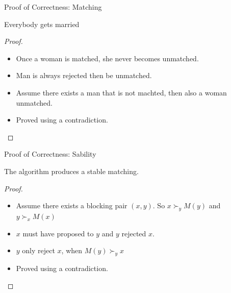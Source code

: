 \documentclass{beamer}
\begin{document}

\begin{frame}{Proof of Correctness: Matching}
\begin{theorem}
    Everybody gets married
\end{theorem} 
\begin{proof}
	\begin{itemize}
		\item Once a woman is matched, she never becomes unmatched.
		\item Man is always rejected then be unmatched.
		\item Assume there exists a man that is not machted, then also a woman unmatched.
		\item Proved using a contradiction.
	\end{itemize}
\end{proof}
\end{frame}






\begin{frame}{Proof of Correctness: Sability}
	\begin{theorem}
		The algorithm produces a stable matching.
	\end{theorem} 
	\begin{proof}
		\begin{itemize}
			\item Assume there exists a blocking pair $(x, y)$. So $x \succ_y M(y)$ and $y \succ_x M(x)$
			\item $x$ must have proposed to $y$ and $y$ rejected $x$.
			\item $y$ only reject $x$, when $M(y) \succ_y x$
			\item Proved using a contradiction.
		\end{itemize}
	\end{proof}
	\end{frame}
\end{document}
